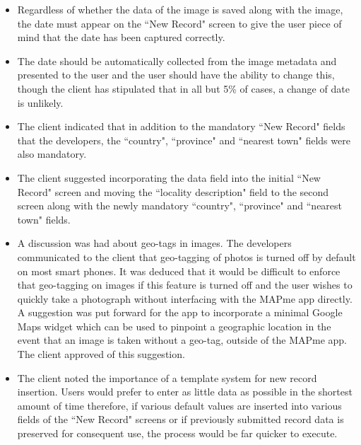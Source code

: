 \documentclass[12pt,a4paper,oneside]{report}
\begin{document}
\begin{itemize}
\item Regardless of whether the data of the image is saved along with the image, the date must appear on the ``New Record" screen to give the user piece of mind that the date has been captured correctly.
\item The date should be automatically collected from the image metadata and presented to the user and the user should have the ability to change this, though the client has stipulated that in all but 5\% of cases, a change of date is unlikely.
\item The client indicated that in addition to the mandatory ``New Record" fields that the developers, the ``country", ``province" and ``nearest town" fields were also mandatory.
\item The client suggested incorporating the data field into the initial ``New Record" screen and moving the ``locality description" field to the second screen along with the newly mandatory ``country", ``province" and ``nearest town" fields.
\item A discussion was had about geo-tags in images.  The developers communicated to the client that geo-tagging of photos is turned off by default on most smart phones.  It was deduced that it would be difficult to enforce that geo-tagging on images if this feature is turned off and the user wishes to quickly take a photograph without interfacing with the MAPme app directly.  A suggestion was put forward for the app to incorporate a minimal Google Maps widget which can be used to pinpoint a geographic location in the event that an image is taken without a geo-tag, outside of the MAPme app.  The client approved of this suggestion.
\item The client noted the importance of a template system for new record insertion.  Users would prefer to enter as little data as possible in the shortest amount of time therefore, if various default values are inserted into various fields of the ``New Record" screens or if previously submitted record data is preserved for consequent use, the process would be far quicker to execute.
\end{itemize}
\end{document}
